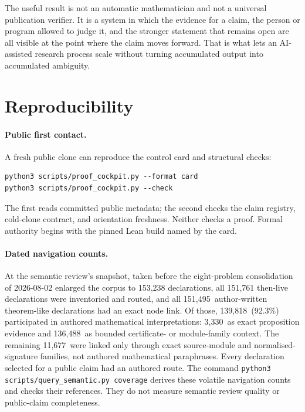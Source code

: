 \documentclass[10pt]{article}
\newcommand{\SemanticAuthoredTheoremLike}{151,495}
\newcommand{\SemanticAuthoredInterpreted}{139,818}
\newcommand{\SemanticDirectEvidence}{3,330}
\newcommand{\SemanticContextual}{136,488}
\newcommand{\SemanticStructuralOnly}{11,677}
\newcommand{\SemanticAuthoredPercent}{92.3}
\begin{document}
The useful result is not an automatic mathematician and not a universal
publication verifier. It is a system in which the evidence for a claim, the
person or program allowed to judge it, and the stronger statement that remains
open are all visible at the point where the claim moves forward. That is what
lets an AI-assisted research process scale without turning accumulated output
into accumulated ambiguity.

\appendix
\small
\section{Reproducibility}\label{app:repro}

\paragraph{Public first contact.}
A fresh public clone can reproduce the control card and structural checks:
\begin{verbatim}
python3 scripts/proof_cockpit.py --format card
python3 scripts/proof_cockpit.py --check
\end{verbatim}
The first reads committed public metadata; the second checks the claim
registry, cold-clone contract, and orientation freshness.  Neither checks a
proof.  Formal authority begins with the pinned Lean build named by the card.

\paragraph{Dated navigation counts.}
At the semantic review's snapshot, taken before the eight-problem
consolidation of 2026-08-02 enlarged the corpus to 153,238 declarations, all
151,761 then-live declarations were inventoried and routed, and all
\SemanticAuthoredTheoremLike\ author-written theorem-like
declarations had an exact node link.  Of those,
\SemanticAuthoredInterpreted\ (\SemanticAuthoredPercent\%) participated in
authored mathematical interpretations: \SemanticDirectEvidence\ as exact
proposition evidence and \SemanticContextual\ as bounded certificate- or
module-family context.  The remaining \SemanticStructuralOnly\ were linked only
through exact source-module and normalised-signature families, not authored
mathematical paraphrases.  Every declaration selected for a public claim had
an authored route.  The command
\texttt{python3 scripts/query\_semantic.py coverage} derives these volatile
navigation counts and checks their references.  They do not measure semantic
review quality or public-claim completeness.
\end{document}
